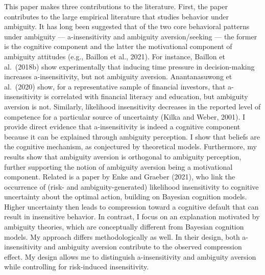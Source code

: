 \documentclass[12pt,a4paper]{article}
\newenvironment{original}
  {\par\medskip\noindent\color{black}\ignorespaces}
  {\par\medskip}
\begin{document}
\begin{original}
This paper makes three contributions to the literature. First, the paper contributes to the large empirical literature that studies behavior under ambiguity. It has long been suggested that of the two core behavioral patterns under ambiguity --- a-insensitivity and ambiguity aversion/seeking --- the former is the cognitive component and the latter the motivational component of ambiguity attitudes (e.g., Baillon et al., 2021). For instance, Baillon et al.\ (2018b) show experimentally that inducing time pressure in decision-making increases a-insensitivity, but not ambiguity aversion. Anantanasuwong et al.\ (2020) show, for a representative sample of financial investors, that a-insensitivity is correlated with financial literacy and education, but ambiguity aversion is not. Similarly, likelihood insensitivity decreases in the reported level of competence for a particular source of uncertainty (Kilka and Weber, 2001). I provide direct evidence that a-insensitivity is indeed a cognitive component because it can be explained through ambiguity perception. I show that beliefs are the cognitive mechanism, as conjectured by theoretical models. Furthermore, my results show that ambiguity aversion is orthogonal to ambiguity perception, further supporting the notion of ambiguity aversion being a motivational component. Related is a paper by Enke and Graeber (2021), who link the occurrence of (risk- and ambiguity-generated) likelihood insensitivity to cognitive uncertainty about the optimal action, building on Bayesian cognition models. Higher uncertainty then leads to compression toward a cognitive default that can result in insensitive behavior. In contrast, I focus on an explanation motivated by ambiguity theories, which are conceptually different from Bayesian cognition models. My approach differs methodologically as well. In their design, both a-insensitivity and ambiguity aversion contribute to the observed compression effect. My design allows me to distinguish a-insensitivity and ambiguity aversion while controlling for risk-induced insensitivity.
\end{original}
\end{document}
